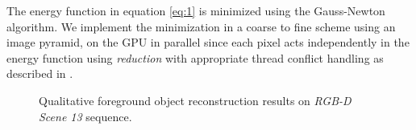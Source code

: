 The energy function in equation \ref{eq:1} is minimized using the Gauss-Newton algorithm. We implement the minimization in a coarse to fine scheme using an image pyramid, on the GPU in parallel since each pixel acts independently in the energy function using \textit{reduction} with appropriate thread conflict handling as described in \cite{dongGPUAcceleratedRobust2019}.

\begin{figure}[t!]
    \centering
    \caption{Qualitative foreground object reconstruction results on \emph{RGB-D Scene 13} sequence.}
    \vspace*{-1em}
    \label{fig:rgbd_scene13}
\end{figure}

